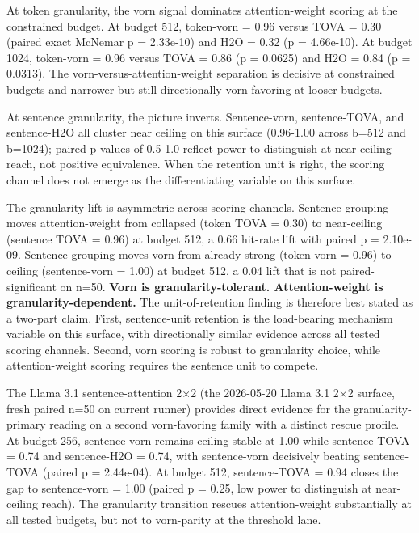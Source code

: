 \documentclass[
]{article}
\begin{document}
At token granularity, the vorn signal dominates
attention-weight scoring at the constrained budget. At budget 512,
token-vorn = 0.96 versus TOVA = 0.30 (paired exact McNemar p =
2.33e-10) and H2O = 0.32 (p = 4.66e-10). At budget 1024,
token-vorn = 0.96 versus TOVA = 0.86 (p = 0.0625) and H2O =
0.84 (p = 0.0313). The vorn-versus-attention-weight separation is
decisive at constrained budgets and narrower but still directionally
vorn-favoring at looser budgets.

At sentence granularity, the picture inverts. Sentence-vorn,
sentence-TOVA, and sentence-H2O all cluster near ceiling on this surface
(0.96-1.00 across b=512 and b=1024); paired p-values of 0.5-1.0 reflect
power-to-distinguish at near-ceiling reach, not positive equivalence.
When the retention unit is right, the scoring channel does not emerge as
the differentiating variable on this surface.

The granularity lift is asymmetric across scoring channels. Sentence
grouping moves attention-weight from collapsed (token TOVA = 0.30)
to near-ceiling (sentence TOVA = 0.96) at budget 512, a 0.66
hit-rate lift with paired p = 2.10e-09. Sentence grouping moves vorn
from already-strong (token-vorn = 0.96) to ceiling (sentence-vorn =
1.00) at budget 512, a 0.04 lift that is not paired-significant on n=50.
\textbf{Vorn is granularity-tolerant. Attention-weight is
granularity-dependent.} The unit-of-retention finding is therefore best
stated as a two-part claim. First, sentence-unit retention is the
load-bearing mechanism variable on this surface, with directionally
similar evidence across all tested scoring channels. Second,
vorn scoring is robust to granularity choice, while
attention-weight scoring requires the sentence unit to compete.

The Llama 3.1 sentence-attention 2×2 (the 2026-05-20 Llama 3.1 2×2
surface, fresh paired n=50 on current runner) provides direct evidence
for the granularity-primary reading on a second
vorn-favoring family with a distinct rescue profile. At
budget 256, sentence-vorn remains ceiling-stable at 1.00 while
sentence-TOVA = 0.74 and sentence-H2O = 0.74, with
sentence-vorn decisively beating sentence-TOVA (paired p =
2.44e-04). At budget 512, sentence-TOVA = 0.94 closes the gap to
sentence-vorn = 1.00 (paired p = 0.25, low power to distinguish at
near-ceiling reach). The granularity transition rescues attention-weight
substantially at all tested budgets, but not to vorn-parity at the
threshold lane.
\end{document}
